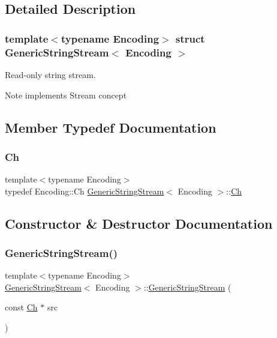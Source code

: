 \subsection{Detailed Description}
\subsubsection*{template$<$typename Encoding$>$\newline
struct Generic\+String\+Stream$<$ Encoding $>$}

Read-\/only string stream. 

\begin{DoxyNote}{Note}
implements Stream concept 
\end{DoxyNote}


\subsection{Member Typedef Documentation}
\mbox{\label{structGenericStringStream_a4289aca895330084ff3168e37e4f08bd}} 
\subsubsection{\texorpdfstring{Ch}{Ch}}
{\footnotesize\ttfamily template$<$typename Encoding$>$ \\
typedef Encoding\+::\+Ch \hyperlink{structGenericStringStream}{Generic\+String\+Stream}$<$ Encoding $>$\+::\hyperlink{structGenericStringStream_a4289aca895330084ff3168e37e4f08bd}{Ch}}



\subsection{Constructor \& Destructor Documentation}
\mbox{\label{structGenericStringStream_a6b20885ed64e33f5d081a1e83b07da06}} 
\subsubsection{\texorpdfstring{Generic\+String\+Stream()}{GenericStringStream()}}
{\footnotesize\ttfamily template$<$typename Encoding$>$ \\
\hyperlink{structGenericStringStream}{Generic\+String\+Stream}$<$ Encoding $>$\+::\hyperlink{structGenericStringStream}{Generic\+String\+Stream} (\begin{DoxyParamCaption}\item[{const \hyperlink{structGenericStringStream_a4289aca895330084ff3168e37e4f08bd}{Ch} $\ast$}]{src }\end{DoxyParamCaption})\hspace{0.3cm}{\ttfamily [inline]}}



